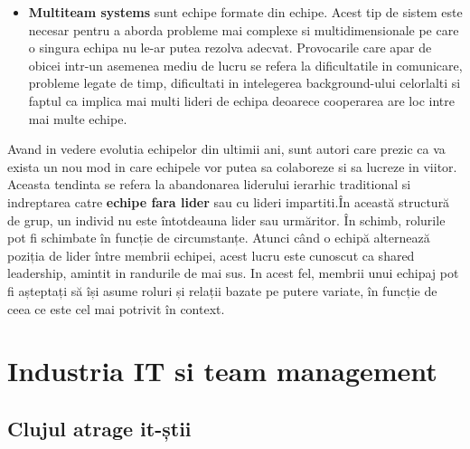 \documentclass[a4paper, 12pt]{article}
\begin{document}
\begin{itemize}
	\item \textbf{Multiteam systems} sunt echipe formate din echipe. Acest tip de sistem este necesar pentru a aborda probleme mai complexe si multidimensionale pe care o singura echipa nu le-ar putea rezolva adecvat. Provocarile care apar de obicei intr-un asemenea mediu de lucru  se refera la dificultatile in comunicare, probleme legate de timp, dificultati in intelegerea background-ului celorlalti si faptul ca implica mai multi lideri de echipa deoarece cooperarea are loc intre mai multe echipe.
	
\end{itemize}

	\quad\quad Avand in vedere evolutia echipelor din ultimii ani, sunt autori care prezic ca va exista un nou mod in care echipele vor putea sa colaboreze si sa lucreze in viitor. Aceasta tendinta se refera la abandonarea liderului ierarhic traditional si indreptarea catre \textbf{echipe fara lider} sau cu lideri impartiti.În această structură de grup, un individ nu este întotdeauna lider sau urmăritor. În schimb, rolurile pot fi schimbate în funcție de circumstanțe. Atunci când o echipă alternează poziția de lider între membrii echipei, acest lucru este cunoscut ca shared leadership, amintit in randurile de mai sus. In acest fel, membrii unui echipaj pot fi așteptați să își asume roluri și relații bazate pe putere variate, în funcție de ceea ce este cel mai potrivit în context.

\newpage
	\setcounter{section}{1}

	\section{Industria IT si team management}

	\subsection{Clujul atrage it-știi}
\end{document}
